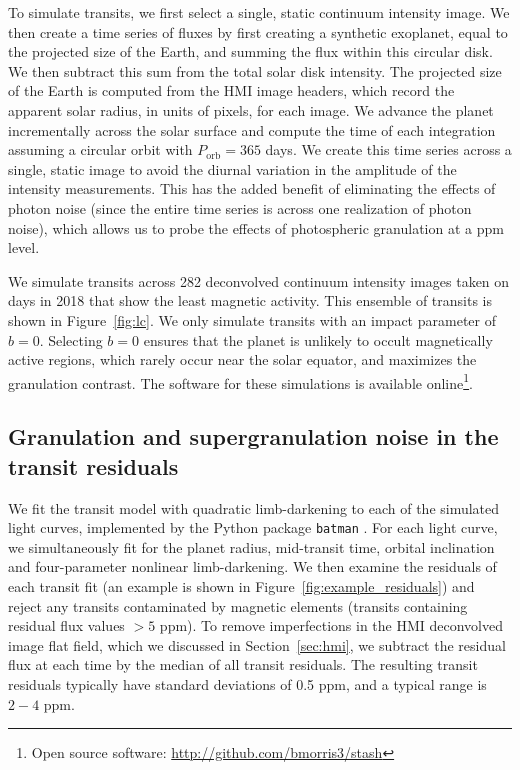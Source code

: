 To simulate transits, we first select a single, static continuum intensity image. We then create a time series of fluxes by first creating a synthetic exoplanet, equal to the projected size of the Earth, and summing the flux within this circular disk. We then subtract this sum from the total solar disk intensity. The projected size of the Earth is computed from the HMI image headers, which record the apparent solar radius, in units of pixels, for each image. We advance the planet incrementally across the solar surface and compute the time of each integration assuming a circular orbit with $P_\mathrm{orb} = 365$ days. We create this time series across a single, static image to avoid the diurnal variation in the amplitude of the intensity measurements. This has the added benefit of eliminating the effects of photon noise (since the entire time series is across one realization of photon noise), which allows us to probe the effects of photospheric granulation at a ppm level. 

We simulate transits across 282 deconvolved continuum intensity images taken on days in 2018 that show the least magnetic activity. This ensemble of transits is shown in Figure~\ref{fig:lc}. We only simulate transits with an impact parameter of $b=0$. Selecting $b=0$ ensures that the planet is unlikely to occult magnetically active regions, which rarely occur near the solar equator, and maximizes the granulation contrast. The software for these simulations is available online\footnote{Open source software: \url{http://github.com/bmorris3/stash}}. 

\subsection{Granulation and supergranulation noise in the transit residuals} \label{sec:granulation}

We fit the \citet{Mandel2002} transit model with quadratic limb-darkening to each of the simulated light curves, implemented by the Python package \texttt{batman} \citep{Kreidberg2015}. For each light curve, we simultaneously fit for the planet radius, mid-transit time, orbital inclination and four-parameter nonlinear limb-darkening. We then examine the residuals of each transit fit (an example is shown in Figure~\ref{fig:example_residuals}) and reject any transits contaminated by magnetic elements (transits containing residual flux values $>5$ ppm). To remove imperfections in the HMI deconvolved image flat field, which we discussed in Section~\ref{sec:hmi}, we subtract the residual flux at each time by the median of all transit residuals. The resulting transit residuals typically have standard deviations of 0.5 ppm, and a typical range is $2-4$ ppm.

